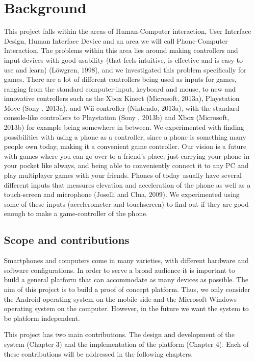 \documentclass{article}
\begin{document}
\section{Background}
This project falls within the areas of Human-Computer interaction, User Interface Design, Human
Interface Device and an area we will call Phone-Computer Interaction. The problems within
this area lies around making controllers and input devices with good usability (that feels intuitive,
is effective and is easy to use and learn) (Löwgren, 1998), and we investigated this problem
specifically for games. There are a lot of different controllers being used as inputs for games,
ranging from the standard computer-input, keyboard and mouse, to new and innovative controllers
such as the Xbox Kinect (Microsoft, 2013a), Playstation Move (Sony , 2013a), and Wii-controller
(Nintendo, 2013a), with the standard console-like controllers to Playstation (Sony ,
2013b) and Xbox (Microsoft, 2013b) for example being somewhere in between. We experimented
with finding possibilities with using a phone as a controller, since a phone is something
many people own today, making it a convenient game controller. Our vision is a future with
games where you can go over to a friend’s place, just carrying your phone in your pocket like always,
and being able to conveniently connect it to any PC and play multiplayer games with your
friends. Phones of today usually have several different inputs that measures elevation and acceleration
of the phone as well as a touch-screen and microphone (Joselli and Clua, 2009). We experimented
using some of these inputs (accelerometer and touchscreen) to find out if they are
good enough to make a game-controller of the phone. 

\subsection{Scope and contributions} 
Smartphones and computers come in many varieties, with different hardware and software
configurations. In order to serve a broad audience it is important to build a general platform that
can accommodate as many devices as possible. The aim of this project is to build a proof of
concept platform. Thus, we only consider the Android operating system on the mobile side and
the Microsoft Windows operating system on the computer. However, in the future we want the
system to be platform independent.

This project has two main contributions. The design and development of the system (Chapter
3) and the implementation of the platform (Chapter 4). Each of these contributions will be addressed in the following chapters.
\end{document}
